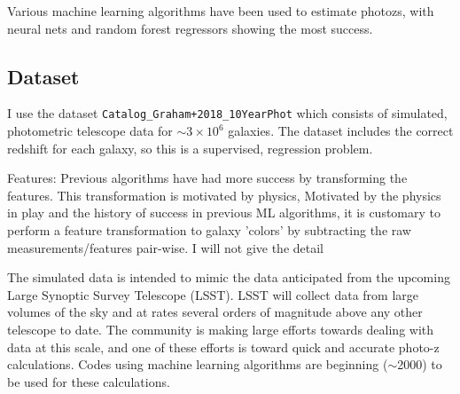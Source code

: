 \documentclass[13pt]{amsart}
\begin{document}
Various machine learning algorithms have been used to estimate photozs, with neural nets and random forest regressors showing the most success.


  \subsection{Dataset}

    I use the dataset \texttt{Catalog\_Graham+2018\_10YearPhot} which consists of simulated, photometric telescope data for $\sim3 \times 10^{6}$ galaxies. The dataset includes the correct redshift for each galaxy, so this is a supervised, regression problem.

    Features: Previous algorithms have had more success by transforming the features. This transformation is motivated by physics,   Motivated by the physics in play and the history of success in previous ML algorithms, it is customary to perform a feature transformation to galaxy 'colors' by subtracting the raw measurements/features pair-wise. I will not give the detail

    The simulated data is intended to mimic the data anticipated from the upcoming Large Synoptic Survey Telescope (LSST). LSST will collect data from large volumes of the sky and at rates several orders of magnitude above any other telescope to date. The community is making large efforts towards dealing with data at this scale, and one of these efforts is toward quick and accurate photo-z calculations. Codes using machine learning algorithms are beginning ($\sim$2000) to be used for these calculations.
\end{document}
